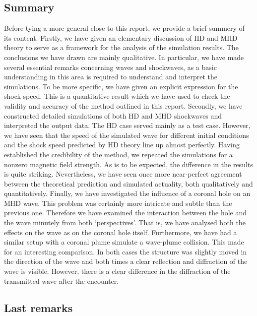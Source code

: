 \subsection*{Summary}

Before tying a more general close to this report, we provide a brief summery of its content. 
Firstly, we have given an elementary discussion of HD and MHD theory to serve as a framework for the analysis of the simulation results. The conclusions we have drawn are mainly qualitative. In particular, we have made several essential remarks concerning waves and shockwaves, as a basic understanding in this area is required to understand and interpret the simulations. To be more specific, we have given an explicit expression for the shock speed. This is a quantitative result which we have used to check the validity and accuracy of the method outlined in this report.
Secondly, we have constructed detailed simulations of both HD and MHD shockwaves and interpreted the output data. The HD case served mainly as a test case. However, we have seen that the speed of the simulated wave for different initial conditions and the shock speed predicted by HD theory line up almost perfectly. Having established the credibility of the method, we repeated the simulations for a nonzero magnetic field strength. As is to be expected, the difference in the results is quite striking. Nevertheless, we have seen once more near-perfect agreement between the theoretical prediction and simulated actuality, both qualitatively and quantitatively.
Finally, we have investigated the influence of a coronal hole on an MHD wave. This problem was certainly more intricate and subtle than the previous one. Therefore we have examined the interaction between the hole and the wave minutely from both `perspectives'. That is, we have analysed both the effects on the wave as on the coronal hole itself. Furthermore, we have had a similar setup with a coronal plume simulate a wave-plume collision. This made for an interesting comparison. In both cases the structure was slightly moved in the direction of the wave and both times a clear reflection and diffraction of the wave is visible. However, there is a clear difference in the diffraction of the transmitted wave after the encounter. 

\subsection*{Last remarks}

